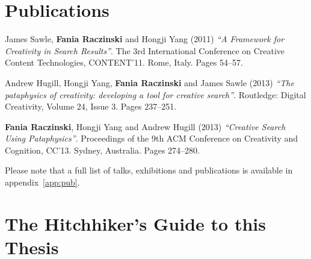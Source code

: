 \begin{comment}
  abusing tech in creative ways can yield useful results
  pataphysics = Creativity

  combining the pseudo philosophy of pataphysics with sematically structured algorithms which use programming APIs and computational linguistics to produce original creative works.

  overturn expectations
  subvert browsing
  undermine relevance
  corrupt results
\end{comment}


\section{Publications}

James Sawle, \textbf{Fania Raczinski} and Hongji Yang (2011) \emph{``A Framework for Creativity in Search Results''}. The 3rd International Conference on Creative Content Technologies, CONTENT'11. Rome, Italy. Pages 54--57.

Andrew Hugill, Hongji Yang, \textbf{Fania Raczinski} and James Sawle (2013) \emph{``The pataphysics of creativity: developing a tool for creative search''}. Routledge: Digital Creativity, Volume 24, Issue 3. Pages 237--251.

\textbf{Fania Raczinski}, Hongji Yang and Andrew Hugill (2013) \emph{``Creative Search Using Pataphysics''}. Proceedings of the 9th ACM Conference on Creativity and Cognition, CC'13. Sydney, Australia. Pages 274--280.

Please note that a full list of talks, exhibitions and publications is available in appendix~\ref{app:pub}.


\section{The Hitchhiker's Guide to this Thesis}

